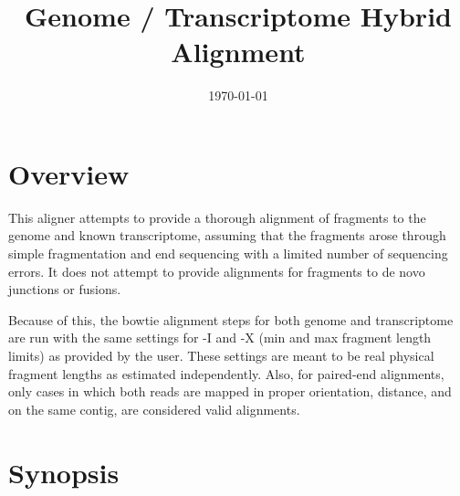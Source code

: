 \documentclass[10pt]{article}
\title{Genome / Transcriptome Hybrid Alignment}
\date{\today}
\begin{document}
\maketitle

\section*{Overview}

This aligner attempts to provide a thorough alignment of fragments to
the genome and known transcriptome, assuming that the fragments arose
through simple fragmentation and end sequencing with a limited number
of sequencing errors. It does not attempt to provide alignments for
fragments to de novo junctions or fusions.

Because of this, the bowtie alignment steps for both genome and
transcriptome are run with the same settings for -I and -X (min and
max fragment length limits) as provided by the user. These settings
are meant to be real physical fragment lengths as estimated
independently. Also, for paired-end alignments, only cases in which
both reads are mapped in proper orientation, distance, and on the same
contig, are considered valid alignments.

\section*{Synopsis}
\end{document}
